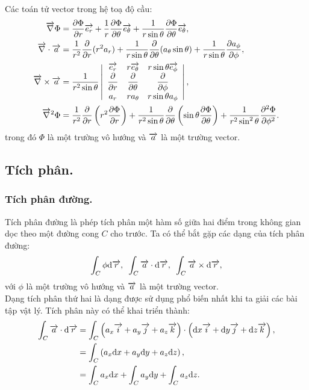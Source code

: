 \begin{appendices}
\begin{align*}
\end{align*}
Các toán tử vector trong hệ toạ độ cầu:
\begin{align*}
    \overrightarrow{\nabla}\Phi&=\dfrac{\partial \Phi}{\partial r}\overrightarrow{e_r}+\dfrac{1}{r} \dfrac{\partial \Phi}{\partial \theta}\overrightarrow{e_\theta}+\dfrac{1}{r\sin{\theta}}\dfrac{\partial \Phi}{\partial \theta}\overrightarrow{e_\theta},\\
    \overrightarrow{\nabla}\cdot\overrightarrow{a}&=\dfrac{1}{r^2}\dfrac{\partial}{\partial r}(r^2 a_r)+\dfrac{1}{r\sin{\theta}} \dfrac{\partial }{\partial \theta}(a_\theta\sin{\theta})+\dfrac{1}{r\sin{\theta}}\dfrac{\partial a_\phi}{\partial \phi},\\
    \overrightarrow{\nabla}\times\overrightarrow{a}&=\dfrac{1}{r^2\sin{\theta}}\left|\begin{array}{ccc}
    \overrightarrow{e_r} & r\overrightarrow{e_\theta} & r\sin{\theta}\overrightarrow{e_\phi} \\
    \dfrac{\partial}{\partial r} & \dfrac{\partial}{\partial\theta} & \dfrac{\partial}{\partial \phi} \\
    a_r & ra_\theta & r\sin{\theta}a_\phi
    \end{array}\right|,\\
    \overrightarrow{\nabla}^2\Phi&=\dfrac{1}{r^2}\dfrac{\partial}{ \partial r}\left(r^2\dfrac{\partial\Phi}{\partial r}\right)+\dfrac{1}{r^2\sin{\theta}}\dfrac{\partial}{\partial\theta}\left(\sin{\theta}\dfrac{\partial\Phi}{ \partial \theta}\right)+\dfrac{1}{r^2\sin^2{\theta}}\dfrac{\partial^2\Phi}{\partial \phi^2}.
    \end{align*}
trong đó $\Phi$ là một trường vô hướng và $\overrightarrow{a}$ là một trường vector.
\subsection{Tích phân.}
\subsubsection{Tích phân đường.}
Tích phân đường là phép tích phân một hàm số giữa hai điểm trong không gian dọc theo một đường cong $C$ cho trước. Ta có thể bắt gặp các dạng của tích phân đường:
$$\int_C \phi\mathrm{d} \overrightarrow{r},\text{ }\int_C \overrightarrow{a}\cdot\mathrm{d} \overrightarrow{r},\text{ }\int_C \overrightarrow{a}\times\mathrm{d} \overrightarrow{r},$$
với $\phi$ là một trường vô hướng và $\overrightarrow{a}$ là một trường vector.\\
Dạng tích phân thứ hai là dạng được sử dụng phổ biến nhất khi ta giải các bài tập vật lý. Tích phân này có thể khai triển thành:
\begin{align*}
    \int_{C}\overrightarrow{a}\cdot\mathrm{d}\overrightarrow{r}&=\int_C\left(a_x\overrightarrow{i}+a_y\overrightarrow{j}+a_z\overrightarrow{k}\right)\cdot\left(\mathrm{d} x\overrightarrow{i}+\mathrm{d} y\overrightarrow{j}+\mathrm{d} z\overrightarrow{k}\right),\\
    &=\int_C\left(a_x\mathrm{d} x+a_y\mathrm{d} y+a_z\mathrm{d} z\right),\\
    &=\int_Ca_x\mathrm{d} x+\int_Ca_y\mathrm{d} y+\int_Ca_z\mathrm{d} z.
\end{align*}
\begin{center}



\end{center}
\end{appendices}
